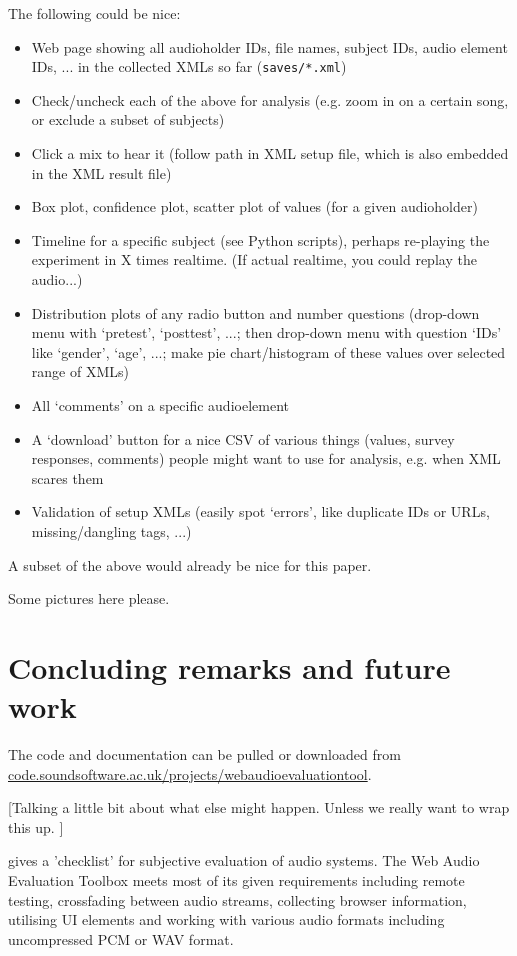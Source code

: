 \documentclass{sig-alternate}
\begin{document}
	The following could be nice: 
	
	\begin{itemize}[noitemsep,nolistsep]
		\item Web page showing all audioholder IDs, file names, subject IDs, audio element IDs, ... in the collected XMLs so far (\texttt{saves/*.xml})
		\item Check/uncheck each of the above for analysis (e.g. zoom in on a certain song, or exclude a subset of subjects)
		\item Click a mix to hear it (follow path in XML setup file, which is also embedded in the XML result file)
		\item Box plot, confidence plot, scatter plot of values (for a given audioholder)
		\item Timeline for a specific subject (see Python scripts), perhaps re-playing the experiment in X times realtime. (If actual realtime, you could replay the audio...)
		\item Distribution plots of any radio button and number questions (drop-down menu with `pretest', `posttest', ...; then drop-down menu with question `IDs' like `gender', `age', ...; make pie chart/histogram of these values over selected range of XMLs)
		\item All `comments' on a specific audioelement
		\item A `download' button for a nice CSV of various things (values, survey responses, comments) people might want to use for analysis, e.g. when XML scares them
		\item Validation of setup XMLs (easily spot `errors', like duplicate IDs or URLs, missing/dangling tags, ...)
	\end{itemize}

	A subset of the above would already be nice for this paper. 
	
	Some pictures here please. 

\section{Concluding remarks and future work}
	
	The code and documentation can be pulled or downloaded from \url{code.soundsoftware.ac.uk/projects/webaudioevaluationtool}. 
	
	[Talking a little bit about what else might happen. Unless we really want to wrap this up. ]
	
	\cite{schoeffler2015mushra} gives a 'checklist' for subjective evaluation of audio systems. The Web Audio Evaluation Toolbox meets most of its given requirements including remote testing, crossfading between audio streams, collecting browser information, utilising UI elements and working with various audio formats including uncompressed PCM or WAV format.
\end{document}
